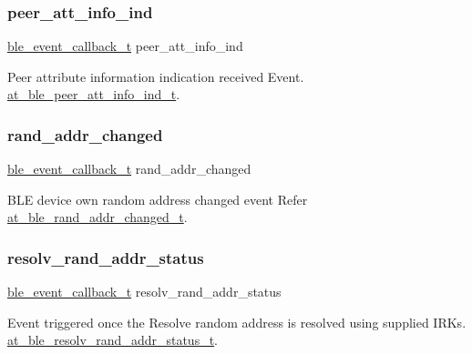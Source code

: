 \subsubsection{\texorpdfstring{peer\_att\_info\_ind}{peer\_att\_info\_ind}}
{\footnotesize\ttfamily \mbox{\hyperlink{ble__manager_8h_a04ce4bb8cb8282f2762e3924b1773cc9}{ble\+\_\+event\+\_\+callback\+\_\+t}} peer\+\_\+att\+\_\+info\+\_\+ind}



Peer attribute information indication received Event. \mbox{\hyperlink{structat__ble__peer__att__info__ind__t}{at\+\_\+ble\+\_\+peer\+\_\+att\+\_\+info\+\_\+ind\+\_\+t}}. 

\mbox{\label{structble__gap__event__cb_a85b2130f83424798ff217b85989c4274}} 
\subsubsection{\texorpdfstring{rand\_addr\_changed}{rand\_addr\_changed}}
{\footnotesize\ttfamily \mbox{\hyperlink{ble__manager_8h_a04ce4bb8cb8282f2762e3924b1773cc9}{ble\+\_\+event\+\_\+callback\+\_\+t}} rand\+\_\+addr\+\_\+changed}



B\+LE device own random address changed event Refer \mbox{\hyperlink{at__ble__api_8h_a774212504efdbcbb607153f99dd71a80}{at\+\_\+ble\+\_\+rand\+\_\+addr\+\_\+changed\+\_\+t}}. 

\mbox{\label{structble__gap__event__cb_afae8e9c934def7a93731076e226f8fa2}} 
\subsubsection{\texorpdfstring{resolv\_rand\_addr\_status}{resolv\_rand\_addr\_status}}
{\footnotesize\ttfamily \mbox{\hyperlink{ble__manager_8h_a04ce4bb8cb8282f2762e3924b1773cc9}{ble\+\_\+event\+\_\+callback\+\_\+t}} resolv\+\_\+rand\+\_\+addr\+\_\+status}



Event triggered once the Resolve random address is resolved using supplied I\+RK\textquotesingle{}s. \mbox{\hyperlink{structat__ble__resolv__rand__addr__status__t}{at\+\_\+ble\+\_\+resolv\+\_\+rand\+\_\+addr\+\_\+status\+\_\+t}}. 

